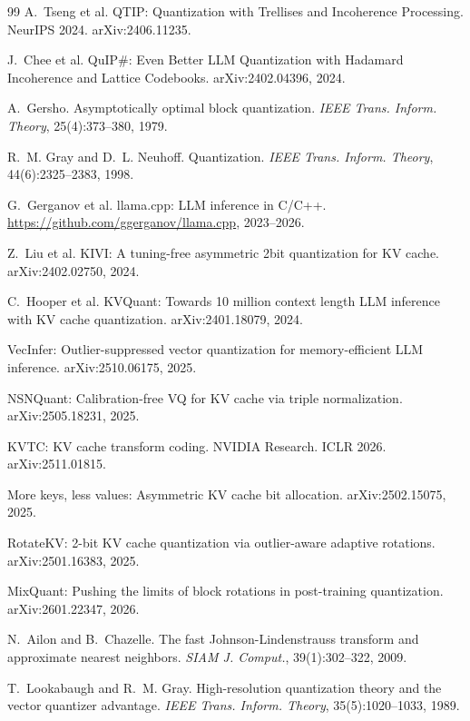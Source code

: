 \documentclass{article}
\begin{document}
\begin{thebibliography}{99}
A.~Tseng et al.
QTIP: Quantization with Trellises and Incoherence Processing.
NeurIPS 2024. arXiv:2406.11235.

J.~Chee et al.
QuIP\#: Even Better LLM Quantization with Hadamard Incoherence and Lattice
Codebooks. arXiv:2402.04396, 2024.

A.~Gersho.
Asymptotically optimal block quantization.
\textit{IEEE Trans. Inform. Theory}, 25(4):373--380, 1979.

R.~M. Gray and D.~L. Neuhoff.
Quantization.
\textit{IEEE Trans. Inform. Theory}, 44(6):2325--2383, 1998.


G.~Gerganov et al.
llama.cpp: LLM inference in C/C++.
{\small\url{https://github.com/ggerganov/llama.cpp}}, 2023--2026.

Z.~Liu et al.
KIVI: A tuning-free asymmetric 2bit quantization for KV cache.
arXiv:2402.02750, 2024.

C.~Hooper et al.
KVQuant: Towards 10 million context length LLM inference with KV cache
quantization. arXiv:2401.18079, 2024.

VecInfer: Outlier-suppressed vector quantization for memory-efficient LLM
inference. arXiv:2510.06175, 2025.

NSNQuant: Calibration-free VQ for KV cache via triple normalization.
arXiv:2505.18231, 2025.

KVTC: KV cache transform coding.
NVIDIA Research. ICLR 2026. arXiv:2511.01815.

More keys, less values: Asymmetric KV cache bit allocation.
arXiv:2502.15075, 2025.

RotateKV: 2-bit KV cache quantization via outlier-aware adaptive rotations.
arXiv:2501.16383, 2025.

MixQuant: Pushing the limits of block rotations in post-training quantization.
arXiv:2601.22347, 2026.

N.~Ailon and B.~Chazelle.
The fast Johnson-Lindenstrauss transform and approximate nearest neighbors.
\textit{SIAM J. Comput.}, 39(1):302--322, 2009.

T.~Lookabaugh and R.~M. Gray.
High-resolution quantization theory and the vector quantizer advantage.
\textit{IEEE Trans. Inform. Theory}, 35(5):1020--1033, 1989.

\end{thebibliography}
\end{document}

